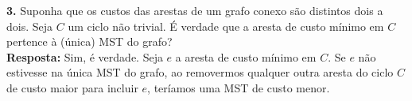 
\noindent\textbf{3.} Suponha que os custos das arestas de um grafo conexo são distintos dois a dois. Seja $C$ um ciclo não trivial. É verdade que a aresta de custo mínimo em $C$ pertence à (única) MST do grafo?\\[6pt]
\textbf{Resposta:} Sim, é verdade. Seja $e$ a aresta de custo mínimo em $C$. Se $e$ não estivesse na única MST do grafo, ao removermos qualquer outra aresta do ciclo $C$ de custo maior para incluir $e$, teríamos uma MST de custo menor.\\[6pt]